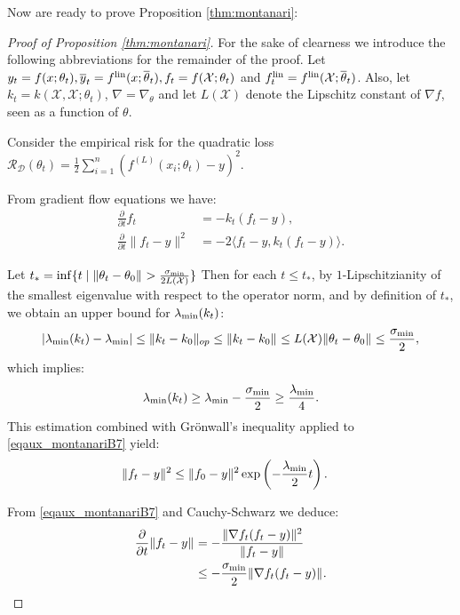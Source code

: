\documentclass{article}
\theoremstyle{definition}
\theoremstyle{remark}
\numberwithin{equation}{section}
\newcommand{\X}{\mathcal{X}}
\newcommand{\lin}{{\textup{lin}}}
\newcommand{\lammin}{\lambda_{\textup{min}}}
\newcommand{\sigmin}{\sigma_{\textup{min}}}
\newcommand{\norm}[2]{
    \|#1\|_{#2}
}
\newcommand{\partv}[1]{
    \frac{\partial}{\partial #1}
}
\begin{document}
Now are ready to prove Proposition \ref{thm:montanari}:

\begin{proof}[Proof of Proposition \ref{thm:montanari}]

For the sake of clearness we introduce the following abbreviations for the remainder of the proof.
    Let $y_t = f(x;\theta_t), \overline y_t = f^\lin(x;\overline \theta_t), f_t = f(\X;\theta_t)$ and $f^\lin_t = f^\lin(\X;\overline \theta_t)$.
Also, let $k_t = k(\X,\X;\theta_t)$, $\nabla = \nabla_\theta$ and let $L(\X)$ denote the Lipschitz constant of $\nabla f$, seen as a function of $\theta$.

Consider the empirical risk for the quadratic loss $\mathcal R_{\mathcal D}(\theta_t) = \frac{1}{2} \sum_{i=1}^{n}(f^{(L)}(x_i;\theta_t)-y)^2$.

From gradient flow equations we have:
\begin{align}
    \frac{\partial}{\partial t} f_t &= -k_t(f_t-y),\\
    \label{eqaux_montanariB7}\partv{t}\norm{f_t-y}{}^2 &= -2\langle f_t-y, k_t(f_t-y)\rangle.
\end{align}

Let $t_* = \inf\{t \mid \norm{\theta_t-\theta_0}{} > \frac{\sigmin}{2L(\X)}\}$ 
Then for each $t \le t_*$, by $1$-Lipschitzianity of the smallest eigenvalue with respect to the operator norm, and by definition of $t_*$, we obtain an upper bound for $\lammin(k_t)$:
\[
    \vert \lammin(k_t) - \lammin \vert \le \norm{k_t-k_0}{op} \le\norm{k_t-k_0}{} \le L(\X)\norm{\theta_t-\theta_0}{}\le \frac{\sigmin}{2},
\]
which implies:
\[
\lammin(k_t) \ge \lammin - \frac{\sigmin}{2} \ge \frac{\lammin}{4}.
\]
This estimation combined with Grönwall's inequality applied to \eqref{eqaux_montanariB7} yield:
\begin{align}
    \label{equax_montanariB8}
    \norm{f_t-y}{}^2 &\le \norm{f_0-y}{}^2 \exp\left(-\frac{\lammin}{2} t\right).
\end{align}

 From \eqref{eqaux_montanariB7} and Cauchy-Schwarz we deduce:
\begin{align}
    \partv{t}\norm{f_t-y}{} &= -\frac{\norm{\nabla f_t (f_t-y)}{}^2}{\norm{f_t-y}{}} \\
    &\le -\frac{\sigmin}{2}\norm{\nabla f_t(f_t-y)}{}.
\end{align}


\end{proof}
\end{document}

